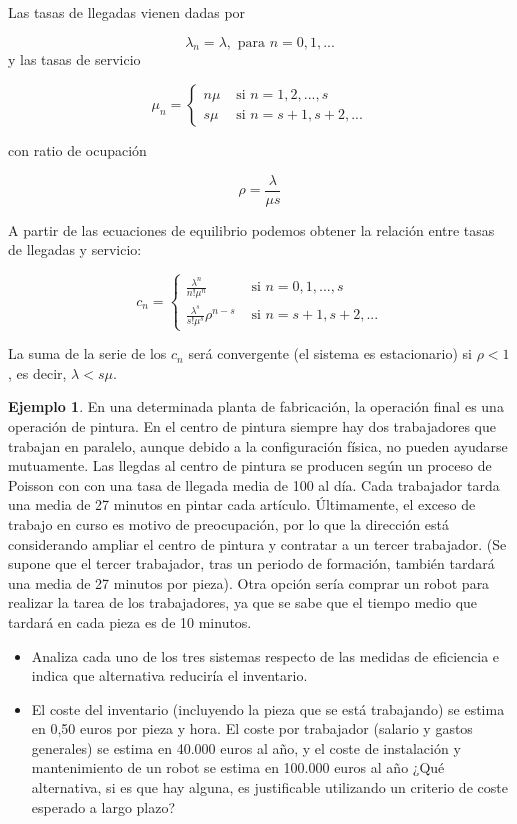 \documentclass[
]{book}
\providecommand{\tightlist}{%
  \setlength{\itemsep}{0pt}\setlength{\parskip}{0pt}}
\theoremstyle{definition}
\theoremstyle{definition}
\newtheorem{example}{Ejemplo}[chapter]
\theoremstyle{definition}
\theoremstyle{definition}
\theoremstyle{remark}
\begin{document}
Las tasas de llegadas vienen dadas por

\[\lambda_n = \lambda, \text{ para } n = 0, 1,...\]
y las tasas de servicio

\[\mu_n = 
\begin{cases}
n\mu & \text{ si } n = 1, 2,...,s\\
s\mu & \text{ si } n = s+1, s+2,...
\end{cases}
\]

con ratio de ocupación

\[\rho = \frac{\lambda}{\mu s}\]

A partir de las ecuaciones de equilibrio podemos obtener la relación entre tasas de llegadas y servicio:

\[
c_n =
\begin{cases}
\frac{\lambda^n}{n!\mu^n} & \text{ si } n = 0, 1,...,s\\
\frac{\lambda^s}{s!\mu^s}\rho^{n-s} & \text{ si } n = s+1, s+2,...
\end{cases}
\]

La suma de la serie de los \(c_n\) será convergente (el sistema es estacionario) si \(\rho < 1\), es decir,
\(\lambda < s\mu\).

\begin{example}

En una determinada planta de fabricación, la operación final es una operación de pintura. En el centro de pintura siempre hay dos trabajadores que trabajan en paralelo, aunque debido a la configuración física, no pueden ayudarse mutuamente. Las llegdas al centro de pintura se producen según un proceso de Poisson con
con una tasa de llegada media de 100 al día. Cada trabajador tarda una media de 27 minutos en pintar cada artículo. Últimamente, el exceso de trabajo en curso es motivo de preocupación, por lo que la dirección está considerando ampliar el centro de pintura y contratar a un tercer trabajador. (Se supone que el tercer trabajador, tras un periodo de formación, también tardará una media de 27 minutos por pieza). Otra opción sería comprar un robot para realizar la tarea de los trabajadores, ya que se sabe que el tiempo medio que tardará en cada pieza es de 10 minutos.

\begin{itemize}
\tightlist
\item
  Analiza cada uno de los tres sistemas respecto de las medidas de eficiencia e indica que alternativa reduciría el inventario.
\item
  El coste del inventario (incluyendo la pieza que se está trabajando) se estima en 0,50 euros por pieza y hora. El coste por trabajador (salario y gastos generales) se estima en 40.000 euros al año, y el coste de instalación y mantenimiento de un robot se estima en 100.000 euros al año ¿Qué alternativa, si es que hay alguna, es justificable utilizando un criterio de coste esperado a largo plazo?
\end{itemize}

\end{example}
\end{document}

